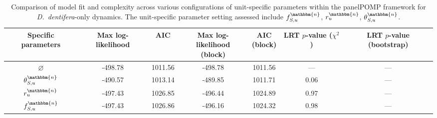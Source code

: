 \documentclass[aoas,preprint]{imsart}\usepackage[]{graphicx}\usepackage[]{xcolor}
\newcommand\unit{u}
\newcommand\native{\mathbbm{n}}
\begin{document}
\begin{table}[h!]
\centering
\begin{center}
\begin{tabular}{||c |c |c |c|c|c|c||}
 \hline
Specific parameters  & Max log-likelihood & AIC & \makecell[c]{Max log-likelihood\\(block)} & \makecell[c]{AIC\\(block)} & \makecell[c]{LRT\\$p$-value\\($\chi^2$)} & \makecell[c]{LRT\\$p$-value\\(bootstrap)}\\ [0.5ex]
 \hline\hline
$\varnothing$ & -498.78& 1011.56& -498.78& 1011.56 & --- & --- \\
$\theta^{\native}_{S,\unit}$  & -490.57& 1013.14& -489.85& 1011.71 & 0.06 & --- \\
$r^{\native}_{\unit}$ & -497.43& 1026.85& -496.44& 1024.89 & 0.97 & --- \\
$f^{\native}_{S,\unit}$ & -497.43& 1026.86& -496.16& 1024.32 & 0.98 & ---\\[1ex]
 \hline
\end{tabular}
\end{center}
\caption{Comparison of model fit and complexity across various configurations of unit-specific parameters within the panelPOMP framework for \textit{D.~dentifera}-only dynamics. The unit-specific parameter setting assessed include $f^{\native}_{S,\unit}$, $r^{\native}_{\unit}$, $\theta^{\native}_{S,\unit}$.}
\label{Table:SRJF_dent_model_comparison}
\end{table}
\end{document}
